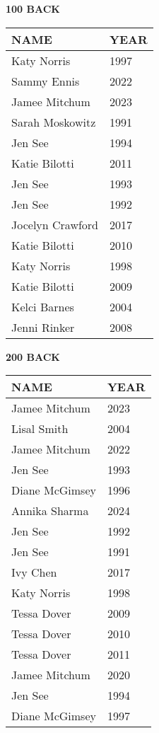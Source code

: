 \begin{table}[H]
\centering
\begin{minipage}[t]{0.48\textwidth}
\centering
\textbf{100 BACK}\\[0.1cm]
\begin{tabular}{@{}p{2.8cm}p{1.2cm}@{}}
\hline
    \textbf{NAME} & \textbf{YEAR} \\
\hline
    Katy Norris & 1997 \\
    Sammy Ennis & 2022 \\
    Jamee Mitchum & 2023 \\
    Sarah Moskowitz & 1991 \\
    Jen See & 1994 \\
    Katie Bilotti & 2011 \\
    Jen See & 1993 \\
    Jen See & 1992 \\
    Jocelyn Crawford & 2017 \\
    Katie Bilotti & 2010 \\
    Katy Norris & 1998 \\
    Katie Bilotti & 2009 \\
    Kelci Barnes & 2004 \\
    Jenni Rinker & 2008 \\
\hline
\end{tabular}
\end{minipage}\hfill
\begin{minipage}[t]{0.48\textwidth}
\centering
\textbf{200 BACK}\\[0.1cm]
\begin{tabular}{@{}p{2.8cm}p{1.2cm}@{}}
\hline
    \textbf{NAME} & \textbf{YEAR} \\
\hline
    Jamee Mitchum & 2023 \\
    Lisal Smith & 2004 \\
    Jamee Mitchum & 2022 \\
    Jen See & 1993 \\
    Diane McGimsey & 1996 \\
    Annika Sharma & 2024 \\
    Jen See & 1992 \\
    Jen See & 1991 \\
    Ivy Chen & 2017 \\
    Katy Norris & 1998 \\
    Tessa Dover & 2009 \\
    Tessa Dover & 2010 \\
    Tessa Dover & 2011 \\
    Jamee Mitchum & 2020 \\
    Jen See & 1994 \\
    Diane McGimsey & 1997 \\
\hline
\end{tabular}
\end{minipage}
\end{table}

